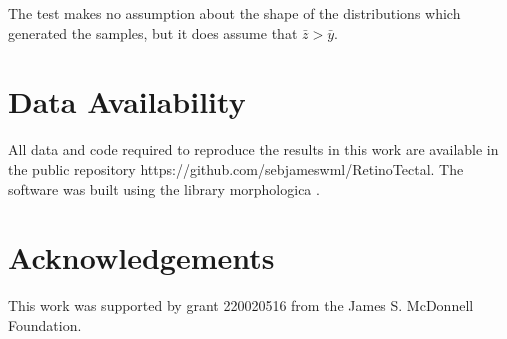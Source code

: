 \documentclass[9pt,lineno,draft]{elife}
\begin{document}
The test makes no assumption about the shape of the distributions which generated the samples, but it does assume that $\bar{z} > \bar{y}$.

\section{Data Availability}

All data and code required to reproduce the results in this work are available in the public repository
{https://github.com/sebjameswml/RetinoTectal}.
The software was built using the library morphologica \citep{james_morphologica_2022}.

\section{Acknowledgements}

This work was supported by grant 220020516 from the James S. McDonnell Foundation.



%
%
\end{document}
